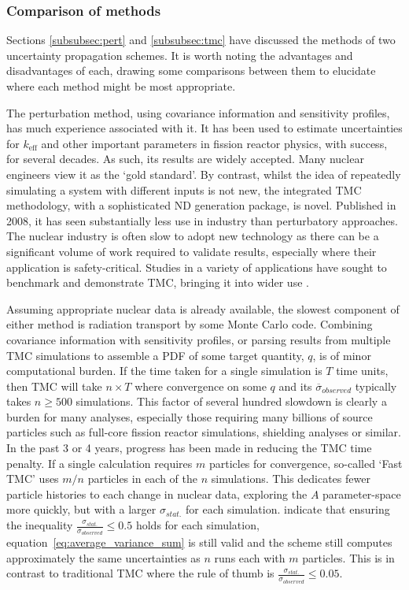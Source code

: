 \FloatBarrier
\subsubsection{Comparison of methods}
Sections \ref{subsubsec:pert} and \ref{subsubsec:tmc} have discussed the methods of two uncertainty propagation schemes. It is worth noting the advantages and disadvantages of each, drawing some comparisons between them to elucidate where each method might be most appropriate.

The perturbation method, using covariance information and sensitivity profiles, has much experience associated with it. It has been used to estimate uncertainties for $k_\mathrm{eff}$ and other important parameters in fission reactor physics, with success, for several decades. As such, its results are widely accepted. Many nuclear engineers view it as the `gold standard'. By contrast, whilst the idea of repeatedly simulating a system with different inputs is not new, the integrated TMC methodology, with a sophisticated ND generation package, is novel. Published in 2008, it has seen substantially less use in industry than perturbatory approaches. The nuclear industry is often slow to adopt new technology as there can be a significant volume of work required to validate results, especially where their application is safety-critical. Studies in a variety of applications have sought to benchmark and demonstrate TMC, bringing it into wider use \cite{Koning2008}\cite{Rochman2010}\cite{Sjostrand2017}\cite{Koning2012}\cite{Alhassan2013}\cite{Alhassan2014}\cite{Rochman2011a}. 

Assuming appropriate nuclear data is already available, the slowest component of either method is radiation transport by some Monte Carlo code. Combining covariance information with sensitivity profiles, or parsing results from multiple TMC simulations to assemble a PDF of some target quantity, $q$, is of minor computational burden. If the time taken for a single simulation is $T$ time units, then TMC will take $n \times T$ where convergence on some $q$ and its $\overline{\sigma}_{observed}$ typically takes $n \geq 500$ simulations\cite{Rochman2014a}. This factor of several hundred slowdown is clearly a burden for many analyses, especially those requiring many billions of source particles such as full-core fission reactor simulations, shielding analyses or similar. In the past 3 or 4 years, progress has been made in reducing the TMC time penalty. If a single calculation requires $m$ particles for convergence, so-called `Fast TMC' uses $m/n$ particles in each of the $n$ simulations. This dedicates fewer particle histories to each change in nuclear data, exploring the $A$ parameter-space more quickly, but with a larger $\sigma_{stat.}$ for each simulation. \citeauthor{Rochman2014a} indicate that ensuring the inequality $\frac{\sigma_{stat.}}{\sigma_{observed}} \leq 0.5$ holds for each simulation, equation~\ref{eq:average_variance_sum} is still valid and the scheme still computes approximately the same uncertainties as $n$ runs each with $m$ particles. This is in contrast to traditional TMC where the rule of thumb is $\frac{\sigma_{stat.}}{\sigma_{observed}} \leq 0.05$.

